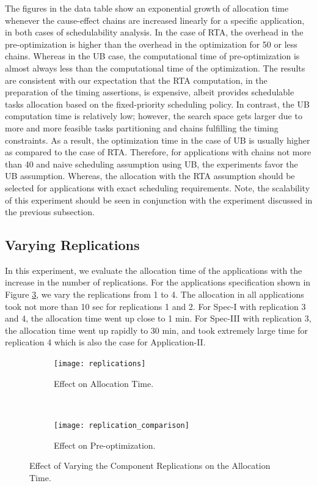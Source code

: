 The figures in the data table show an exponential growth of allocation time whenever the cause-effect chains are increased linearly for a specific application, in both cases of schedulability analysis. In the case of RTA, the overhead in the pre-optimization is higher than the overhead in the optimization for 50 or less chains. Whereas in the UB case, the computational time of pre-optimization is almost always less than the computational time of the optimization. 
The results are consistent with our expectation that the RTA computation, in the preparation of the timing assertions, is expensive, albeit provides schedulable tasks allocation based on the fixed-priority scheduling policy. In contrast, the UB computation time is relatively low; however, the search space gets larger due to more and more feasible tasks partitioning and chains fulfilling the timing constraints. As a result, the optimization time in the case of UB is usually higher as compared to the case of RTA. Therefore, for applications with chains not more than 40 and naive scheduling assumption using UB, the experiments favor the UB assumption. Whereas, the allocation with the RTA assumption should be selected for applications with exact scheduling requirements. Note, the scalability of this experiment should be seen in conjunction with the experiment discussed in the previous subsection.

\subsection{Varying Replications}
In this experiment, we evaluate the allocation time of the applications with the increase in the number of replications. For the applications specification shown in Figure \ref{fig_replication}, we vary the replications from 1 to 4. 
The allocation in all applications took not more than 10 sec for replications 1 and 2. For Spec-I with replication 3 and 4, the allocation time went up close to 1 min. For Spec-III with replication 3, the allocation time went up rapidly to 30 min, and took extremely large time for replication 4 which is also the case for Application-II.
\begin{figure}[h]
    \centering
    \begin{subfigure}[b]{0.475\textwidth}
        \texttt{[image: replications]}
        \caption{Effect on Allocation Time.}
        \label{fig_replication_1}
    \end{subfigure}
    ~
        \begin{subfigure}[b]{0.475\textwidth}
        \texttt{[image: replication\_comparison]}
        \caption{Effect on Pre-optimization.}
        \label{fig_replication_2}
    \end{subfigure}
    \caption{Effect of Varying the Component Replications on the Allocation Time.}
    \label{fig_replication}\vspace{-0.5cm}
\end{figure}

